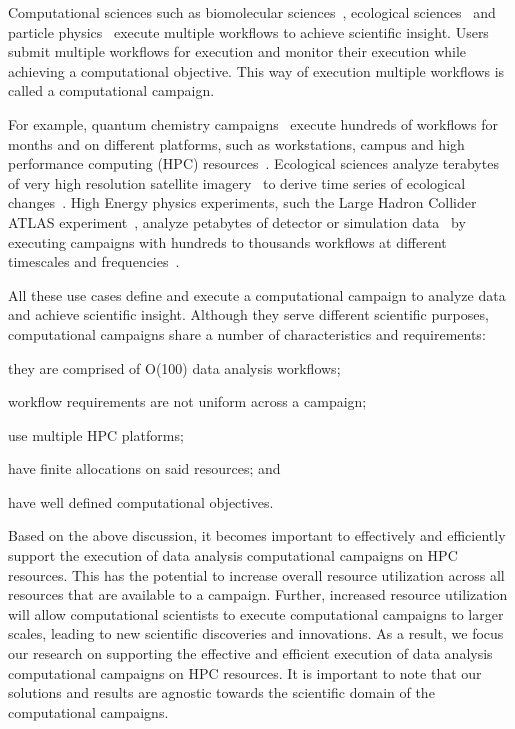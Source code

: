 
Computational sciences such as biomolecular sciences~\cite{cheatham2015impact,
dakka2018concurrent}, ecological sciences~\cite{goncalves2020sealnet,
paraskevakos2019workflow} and particle physics~\cite{atlas} execute multiple
workflows to achieve scientific insight. Users submit multiple workflows for
execution and monitor their execution while achieving a computational objective.
This way of execution multiple workflows is called a computational campaign.

For example, quantum chemistry campaigns~\cite{smith2020molssi} execute hundreds
of workflows for months and on different platforms, such as workstations, campus
and high performance computing (HPC) resources~\cite{smith2020molssi}.
Ecological sciences analyze terabytes of very high resolution satellite
imagery~\cite{goncalves2020sealnet} to derive time series of ecological
changes~\cite{paraskevakos2019workflow}. High Energy physics experiments, such
the Large Hadron Collider ATLAS experiment~\cite{atlas}, analyze petabytes of
detector or simulation data~\cite{borodin2015big} by executing campaigns with
hundreds to thousands workflows at different timescales and
frequencies~\cite{borodin2015big}.

All these use cases define and execute a computational campaign to analyze data
and achieve scientific insight. Although they serve different scientific
purposes, computational campaigns share a number of characteristics and
requirements:
\begin{inparaenum}[(1)]
    \item they are comprised of O(100) data analysis workflows;
    \item workflow requirements are not uniform across a campaign;
    \item use multiple HPC platforms;
    \item have finite allocations on said resources; and
    \item have well defined computational objectives.
\end{inparaenum}

Based on the above discussion, it becomes important to effectively and
efficiently support the execution of data analysis computational campaigns on
HPC resources. This has the potential to increase overall resource utilization
across all resources that are available to a campaign. Further, increased
resource utilization will allow computational scientists to execute
computational campaigns to larger scales, leading to new scientific discoveries
and innovations. As a result, we focus our research on supporting the effective
and efficient execution of data analysis computational campaigns on HPC
resources. It is important to note that our solutions and results are agnostic
towards the scientific domain of the computational campaigns.

